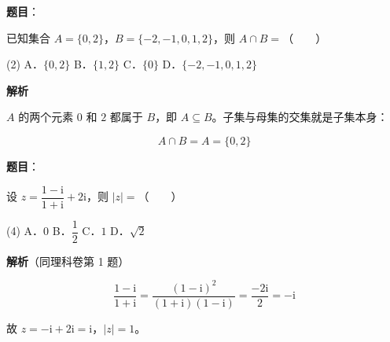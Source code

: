\begin{answer}

\textbf{题目}：

已知集合 $A=\{0,2\}$，$B=\{-2,-1,0,1,2\}$，则 $A\cap B=$\mbox{（　　）}

\begin{gkopts}(2)
\task A．$\{0,2\}$
\task B．$\{1,2\}$
\task C．$\{0\}$
\task D．$\{-2,-1,0,1,2\}$
\end{gkopts}

\textbf{解析}

$A$ 的两个元素 $0$ 和 $2$ 都属于 $B$，即 $A\subseteq B$。子集与母集的交集就是子集本身：

\nopagebreak[4]
\[A\cap B=A=\{0,2\}\]


\par\medskip

\end{answer}
\begin{answer}

\textbf{题目}：

设 $z=\dfrac{1-\mathrm i}{1+\mathrm i}+2\mathrm i$，则 $|z|=$\mbox{（　　）}

\begin{gkopts}(4)
\task A．$0$
\task B．$\dfrac12$
\task C．$1$
\task D．$\sqrt2$
\end{gkopts}

\textbf{解析}（同理科卷第 1 题）

\nopagebreak[4]
\[\frac{1-\mathrm i}{1+\mathrm i}=\frac{(1-\mathrm i)^{2}}{(1+\mathrm i)(1-\mathrm i)}=\frac{-2\mathrm i}2=-\mathrm i\]

故 $z=-\mathrm i+2\mathrm i=\mathrm i$，$|z|=1$。


\par\medskip

\end{answer}

